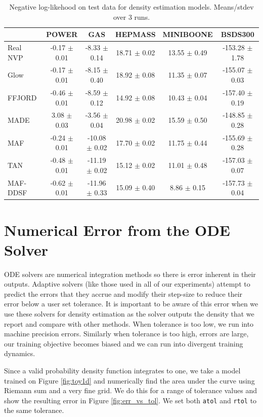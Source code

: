 \documentclass{article} %
\newcommand{\methodname}{FFJORD\xspace}
\newcommand\0{\kern-1.2pt\vec{\kern1.2pt 0}}
\begin{document}
\begin{appendices}
\begin{table}[H]\centering
\setlength{\tabcolsep}{4pt}
\renewcommand{\arraystretch}{1.3}
\begin{tabular}{@{}l|ccccc@{}}
& POWER & GAS & HEPMASS & MINIBOONE & BSDS300  \\
\midrule
Real NVP & -0.17 $\pm$ 0.01 & -8.33 $\pm$ 0.14 & 18.71 $\pm$ 0.02 & 13.55 $\pm$ 0.49 & -153.28 $\pm$ 1.78 \\
Glow & -0.17 $\pm$ 0.01 & -8.15 $\pm$ 0.40 & 18.92 $\pm$ 0.08 & 11.35 $\pm$ 0.07 & -155.07 $\pm$ 0.03 \\
\methodname & -0.46 $\pm$ 0.01 & -8.59 $\pm$ 0.12 & 14.92 $\pm$ 0.08 & 10.43 $\pm$ 0.04 & -157.40 $\pm$ 0.19 \\
\midrule
MADE & 3.08 $\pm$ 0.03 & -3.56 $\pm$ 0.04 & 20.98 $\pm$ 0.02 & 15.59 $\pm$ 0.50 & -148.85 $\pm$ 0.28 \\
MAF  & -0.24 $\pm$ 0.01 & -10.08 $\pm$ 0.02 & 17.70 $\pm$ 0.02 & 11.75 $\pm$ 0.44 & -155.69 $\pm$ 0.28 \\
TAN & -0.48 $\pm$ 0.01 & -11.19 $\pm$ 0.02 & 15.12 $\pm$ 0.02 & 11.01 $\pm$ 0.48 & -157.03 $\pm$ 0.07 \\
MAF-DDSF & -0.62 $\pm$ 0.01 & -11.96 $\pm$ 0.33 & 15.09 $\pm$ 0.40 & 8.86 $\pm$ 0.15 & -157.73 $\pm$ 0.04 
\end{tabular}
\caption{Negative log-likehood on test data for density estimation models. Means/stdev over 3 runs.}
\label{tab:density_stdev}
\end{table}

\section{Numerical Error from the ODE Solver}\label{sec:numerical_error}
ODE solvers are numerical integration methods so there is error inherent in their outputs.
Adaptive solvers (like those used in all of our experiments) attempt to predict the errors that they accrue and modify their step-size to reduce their error below a user set tolerance.
It is important to be aware of this error when we use these solvers for density estimation as the solver outputs the density that we report and compare with other methods.
When tolerance is too low, we run into machine precision errors.
Similarly when tolerance is too high, errors are large, our training objective becomes biased and we can run into divergent training dynamics. 

Since a valid probability density function integrates to one, we take a model trained on Figure \ref{fig:toy1d} and numerically find the area under the curve using Riemann sum and a very fine grid. We do this for a range of tolerance values and show the resulting error in Figure \ref{fig:err_vs_tol}. We set both \verb|atol| and \verb|rtol| to the same tolerance.


\end{appendices}
\end{document}
